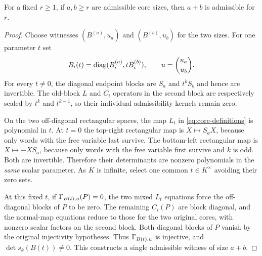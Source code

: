 \begin{theorem}\label{thm:core-add}
For a fixed $r\ge1$, if $a,b\ge r$ are admissible core sizes,
then $a+b$ is admissible for $r$.
\end{theorem}
\begin{proof}
Choose witnesses $(B^{(a)},u_a)$ and $(B^{(b)},u_b)$
for the two sizes. For one parameter $t$ set
\begin{equation}\label{eq:core-add-tuple}
 B_i(t)=\operatorname{diag}(B_i^{(a)},tB_i^{(b)}),\qquad
 u=\binom{u_a}{u_b}.
\end{equation}
For every $t\ne0$, the diagonal endpoint blocks are
$S_a$ and $t^kS_b$ and hence are invertible. The old-block
$L$ and $C_i$ operators in the second block are respectively
scaled by $t^k$ and $t^{k-1}$, so their individual
admissibility kernels remain zero.

On the two off-diagonal rectangular spaces, the map $L_t$
in \eqref{eq:core-definitions} is polynomial in $t$. At $t=0$
the top-right rectangular map is $X\mapsto S_aX$,
because only words with the free variable last survive.
The bottom-left rectangular map is $X\mapsto -XS_a$,
because only words with the free variable first survive and
$k$ is odd. Both are invertible. Therefore their determinants
are nonzero polynomials in the \emph{same} scalar parameter.
As $K$ is infinite, select one common $t\in K^\times$
avoiding their zero sets.

At this fixed $t$, if $\Gamma_{B(t),u}(P)=0$, the two mixed
$L_t$ equations force the off-diagonal blocks of $P$ to be
zero. The remaining $C_i(P)$ are block diagonal, and the
normal-map equations reduce to those for the two original
cores, with nonzero scalar factors on the second block.
Both diagonal blocks of $P$ vanish by the original
injectivity hypotheses. Thus $\Gamma_{B(t),u}$ is injective,
and $\det s_k(B(t))\ne0$. This constructs a single
admissible witness of size $a+b$.
\end{proof}

